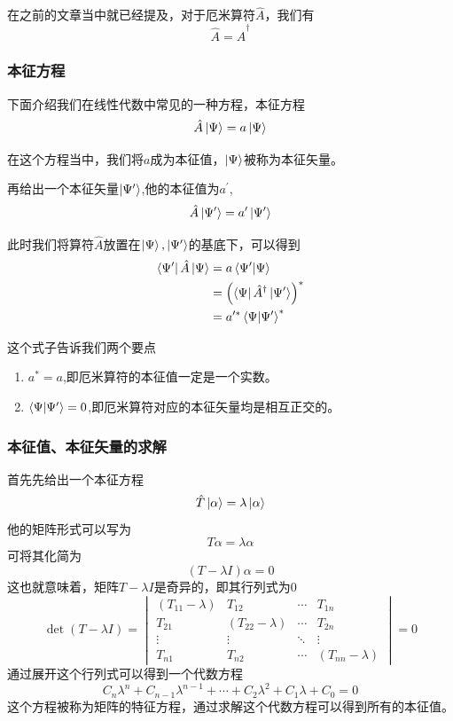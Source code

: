 \documentclass{article}
\newcommand{\h}[1]{\hat{#1}}
\newcommand{\vmfour}[9]{
    \begin{vmatrix}
        #1&#2&\cdots&#3\\
        #4&#5&\cdots&#6\\
        \vdots&\vdots&\ddots&\vdots\\
        #7&#8&\cdots&#9
    \end{vmatrix}
}
\begin{document}
在之前的文章当中就已经提及，对于厄米算符$\hat{A}$，我们有
\[\hat{A}=\hat{A}^\dagger\]

\subsubsection{本征方程}


下面介绍我们在线性代数中常见的一种方程，本征方程
\[\hat{A}\ket{\Psi}=a\ket{\Psi}\]

在这个方程当中，我们将$a$成为本征值，$\ket{\Psi}$被称为本征矢量。

再给出一个本征矢量$\ket{\Psi^\prime}$,他的本征值为$a^\prime$,
\[\hat{A}\ket{\Psi^\prime}=a^\prime\ket{\Psi^\prime}\]

此时我们将算符$\hat{A}$放置在$\ket{\Psi},\ket{\Psi^\prime}$的基底下，可以得到
\begin{align*}
	\bra{\Psi^\prime}\hat{A}\ket{\Psi} & =a\braket{\Psi^\prime}{\Psi}                               \\
	                                   & =\left(\bra{\Psi}\hat{A}^\dagger\ket{\Psi^\prime}\right)^* \\
	                                   & =a^{\prime*}\braket{\Psi}{\Psi^\prime}^*
\end{align*}

这个式子告诉我们两个要点
\begin{enumerate}
	\item $a^*=a$,即厄米算符的本征值一定是一个实数。
	\item $\braket{\Psi}{\Psi^\prime}=0$,即厄米算符对应的本征矢量均是相互正交的。
\end{enumerate}



\subsubsection{本征值、本征矢量的求解}


首先先给出一个本征方程
\[\h{T}\ket{\alpha}=\lambda\ket{\alpha}\]
他的矩阵形式可以写为
\[T\alpha=\lambda\alpha\]
可将其化简为
\[(T-\lambda I)\alpha=0\]
这也就意味着，矩阵$T-\lambda I$是奇异的，即其行列式为0
\[\det(T-\lambda I)=\vmfour{(T_{11}-\lambda)}{T_{12}}{T_{1n}}{T_{21}}{(T_{22}-\lambda)}{T_{2n}}{T_{n1}}{T_{n2}}{(T_{nn}-\lambda)}=0\]
通过展开这个行列式可以得到一个代数方程
\[C_n\lambda^n+C_{n-1}\lambda^{n-1}+\cdots+C_2\lambda^2+C_1\lambda+C_0=0\]
这个方程被称为矩阵的特征方程，通过求解这个代数方程可以得到所有的本征值。
\end{document}
